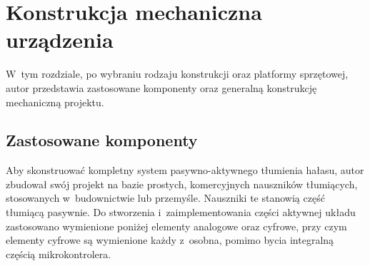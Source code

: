 \chapter{Konstrukcja mechaniczna urządzenia}
\label{cha:constr}
W~tym rozdziale, po wybraniu rodzaju konstrukcji oraz platformy sprzętowej, autor przedstawia zastosowane komponenty oraz generalną konstrukcję mechaniczną projektu.
\section{Zastosowane komponenty}
\label{sec:komponenty}
Aby skonstruować kompletny system pasywno-aktywnego tłumienia hałasu, autor zbudował swój projekt na bazie prostych, komercyjnych nauszników tłumiących, stosowanych w~budownictwie lub przemyśle. Nauszniki te stanowią część tłumiącą pasywnie. Do stworzenia i~zaimplementowania części aktywnej układu zastosowano wymienione poniżej elementy analogowe oraz cyfrowe, przy czym elementy cyfrowe są wymienione każdy z~osobna, pomimo bycia integralną częścią mikrokontrolera.
